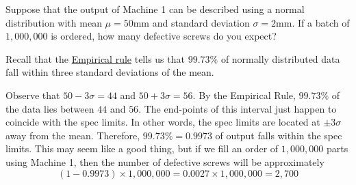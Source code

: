 \documentclass{ximera}
\begin{document}
\begin{example}\label{ex:defParts1}
    Suppose that the output of Machine 1 can be described using a normal distribution with mean $\mu=50$mm and standard deviation $\sigma=2$mm.  If a batch of $1,000,000$ is ordered, how many defective screws do you expect?
    \begin{explanation}
    Recall that the \href{https://en.wikipedia.org/wiki/68%E2%80%9395%E2%80%9399.7_rule}{Empirical rule} tells us that $99.73\%$ of normally distributed data fall within three standard deviations of the mean.

\begin{center}
\end{center}
    
        Observe that $50-3\sigma=44$ and $50+3\sigma=56$.  By the Empirical Rule, $99.73\%$ of the data lies between $44$ and $56$.  The end-points of this interval just happen to coincide with the spec limits.  In other words, the spec limits are located at $\pm 3\sigma$ away from the mean.  Therefore, $99.73\%=0.9973$ of output falls within the spec limits.  This may seem like a good thing, but if we fill an order of $1,000,000$ parts using Machine 1, then the number of defective screws will be approximately
        $$(1-0.9973)\times 1,000,000=0.0027\times 1,000,000=2,700$$       
    \end{explanation}
\end{example}
\end{document}
